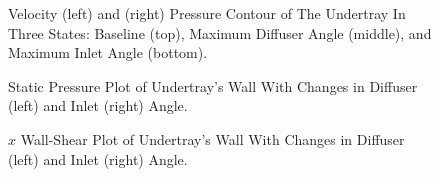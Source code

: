 \begin{center}
  \begin{figure}[!ht]
    \noindent{}
    \caption{Velocity (left) and (right) Pressure Contour of The Undertray In Three States: Baseline (top), Maximum Diffuser Angle (middle), and Maximum Inlet Angle (bottom).}
    \label{fig:compile_2D_EN_pressure_velocity}
\end{figure}


\begin{figure}
    \noindent{}
    \caption{Static Pressure Plot of Undertray's Wall With Changes in Diffuser (left) and Inlet (right) Angle.}
    \label{fig:pressure_plot_2D_EN}
\end{figure}

\begin{figure}
    \noindent{}
    \caption{$x$ Wall-Shear Plot of Undertray's Wall With Changes in Diffuser (left) and Inlet (right) Angle.}
    \label{fig:wall_shear_plot_2D_EN}
\end{figure}  
\end{center}


